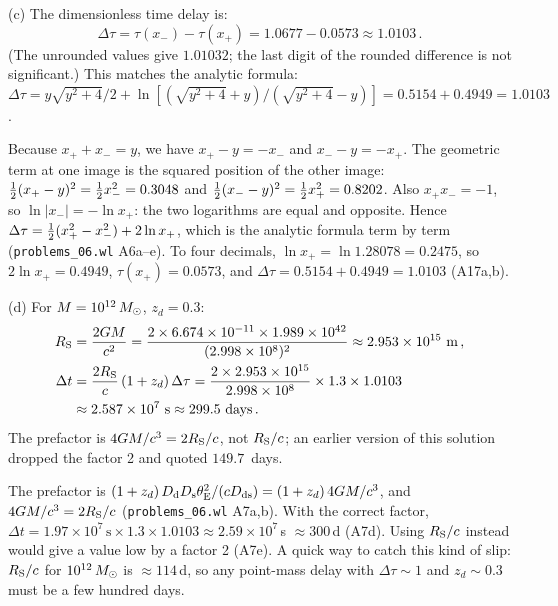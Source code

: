 (c) The dimensionless time delay is:
\begin{equation*}
    \Delta\tau = \tau(x_-) - \tau(x_+) = 1.0677 - 0.0573 \approx 1.0103 \,.
\end{equation*}
(The unrounded values give $1.01032$; the last digit of the rounded
difference is not significant.)
This matches the analytic formula:
$\Delta\tau = y\sqrt{y^2+4}/2 + \ln[(\sqrt{y^2+4}+y)/(\sqrt{y^2+4}-y)]
= 0.5154 + 0.4949 = 1.0103$.  \checkmark

\begin{derivation}
Because $x_+ + x_- = y$, we have $x_+-y = -x_-$ and $x_--y = -x_+$.  The
geometric term at one image is the squared position of the other image:
$\tfrac{1}{2}(x_+-y)^2 = \tfrac{1}{2} x_-^2 = 0.3048$ and $\tfrac{1}{2}(x_--y)^2 = \tfrac{1}{2} x_+^2 = 0.8202$.
Also $x_+x_- = -1$, so $\ln|x_-| = -\ln x_+$: the two logarithms are
equal and opposite.  Hence
$\Delta\tau = \tfrac{1}{2}(x_+^2-x_-^2)+2\ln x_+$, which is the analytic formula
term by term (\texttt{problems\_06.wl} A6a--e).  To four decimals,
$\ln x_+ = \ln 1.28078 = 0.2475$, so $2\ln x_+ = 0.4949$,
$\tau(x_+) = 0.0573$, and $\Delta\tau = 0.5154+0.4949 = 1.0103$ (A17a,b).
\end{derivation}

(d) For $M = 10^{12}\,M_{\odot}$, $z_d = 0.3$:
\begin{align*}
    R_{\mathrm{S}} &= \frac{2G M}{c^2}
    = \frac{2 \times 6.674 \times 10^{-11} \times
    1.989 \times 10^{42}}{(2.998 \times 10^8)^2}
    \approx 2.953 \times 10^{15}~\text{m} \,, \\
    \Delta t &= \frac{2R_{\mathrm{S}}}{c}\,(1 + z_d)\,\Delta\tau
    = \frac{2 \times 2.953 \times 10^{15}}{2.998 \times 10^8}
    \times 1.3 \times 1.0103 \\
    &\approx 2.587 \times 10^{7}~\text{s}
    \approx 299.5~\text{days} \,.
\end{align*}
The prefactor is $4G M/c^3 = 2R_{\mathrm{S}}/c$, not
$R_{\mathrm{S}}/c$; an earlier version of this solution dropped the factor 2
and quoted $149.7$~days.

\begin{annotation}[Factor of 2 in (d)]
The prefactor is $(1+z_d)\,D_{\mathrm{d}}D_{\mathrm{s}}\theta_{\mathrm{E}}^2/(cD_{\mathrm{ds}}) = (1+z_d)\,4G M/c^3$,
and $4G M/c^3 = 2R_{\mathrm{S}}/c$ (\texttt{problems\_06.wl} A7a,b).
With the correct factor,
$\Delta t = 1.97\times10^7\,\mathrm{s}\times1.3\times1.0103\approx2.59\times10^7$\,s
$\approx300$\,d (A7d).  Using $R_{\mathrm{S}}/c$ instead would give a value
low by a factor 2 (A7e).  A quick way to catch this kind of slip: $R_{\mathrm{S}}/c$ for $10^{12}\,M_{\odot}$ is $\approx114$\,d, so any
point-mass delay with $\Delta\tau\sim1$ and $z_d\sim0.3$ must be a few hundred
days.
\end{annotation}

